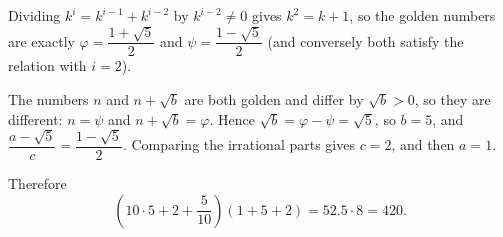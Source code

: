 Dividing $k^i=k^{i-1}+k^{i-2}$ by $k^{i-2}\ne0$ gives $k^2=k+1$, so the golden numbers are exactly $\varphi=\dfrac{1+\sqrt5}{2}$ and $\psi=\dfrac{1-\sqrt5}{2}$ (and conversely both satisfy the relation with $i=2$).

The numbers $n$ and $n+\sqrt b$ are both golden and differ by $\sqrt b>0$, so they are different: $n=\psi$ and $n+\sqrt b=\varphi$. Hence $\sqrt b=\varphi-\psi=\sqrt5$, so $b=5$, and $\dfrac{a-\sqrt5}{c}=\dfrac{1-\sqrt5}{2}$. Comparing the irrational parts gives $c=2$, and then $a=1$.

Therefore
\[
\left(10\cdot5+2+\dfrac{5}{10}\right)(1+5+2)=52.5\cdot8=\boxed{420}.
\]
